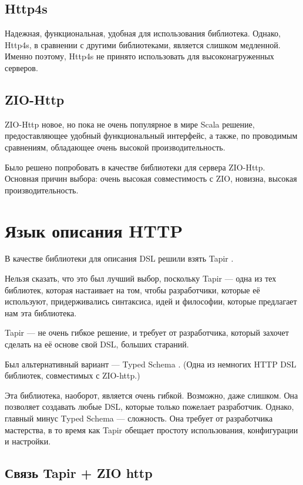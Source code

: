 \documentclass[14pt]{extarticle}
\begin{document}
    \subsection{Http4s\cite{http4s}}
    Надежная, функциональная, удобная для использования библиотека. Однако, Http4s, в сравнении с другими библиотеками,
    является слишком медленной. Именно поэтому, Http4s не принято использовать для высоконагруженных серверов.
    
    \subsection{ZIO-Http\cite{ziohttp}}

    ZIO-Http новое, но пока не очень популярное в мире Scala решение,
    предоставляющее удобный
    функциональный
    интерфейс, а
    также, по проводимым сравнениям, обладающее очень высокой производительность.

    Было решено попробовать в качестве библиотеки для сервера ZIO-Http. Основная причин выбора: очень высокая
    совместимость с ZIO, новизна, высокая производительность.


    \section{Язык описания HTTP}

    В качестве библиотеки для описания DSL решили взять Tapir \cite{tapir}.

    Нельзя сказать, что это был лучший выбор, поскольку Tapir --- одна из тех библиотек, которая настаивает на том,
    чтобы разработчики, которые её используют, придерживались синтаксиса, идей и философии, которые предлагает нам
    эта библиотека.

    Tapir --- не очень гибкое решение, и требует от разработчика, который захочет сделать на её основе свой DSL, больших
    стараний.

    Был альтернативный вариант --- Typed Schema \cite{ts}. (Одна из немногих HTTP DSL библиотек, совместимых с ZIO-http.)

    Эта библиотека, наоборот, является очень гибкой. Возможно, даже слишком. Она позволяет создавать любые DSL,
    которые только пожелает разработчик. Однако, главный минус Typed Schema --- сложность. Она требует от разработчика
    мастерства, в то время как Tapir обещает простоту использования, конфигурации и настройки.

    \newpage
    \subsection{Связь Tapir + ZIO http}
\end{document}
